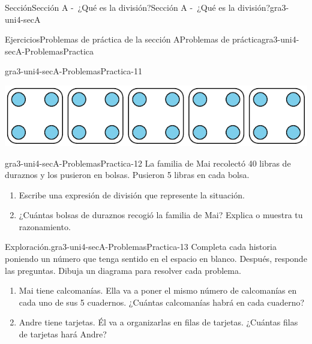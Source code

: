 \documentclass[twoside,10pt,]{article}
\begin{document}
\begin{sectionptx}{Sección}{Sección A -~¿Qué es la división?}{}{Sección A -~¿Qué es la división?}{}{}{gra3-uni4-secA}
\begin{exercises-subsection}{Ejercicios}{Problemas de práctica de la sección A}{}{Problemas de práctica}{}{}{gra3-uni4-secA-ProblemasPractica}
\begin{divisionexercise}{9}{}{}{gra3-uni4-secA-ProblemasPractica-11}
\begin{enumerate}[label=(\alph*)]
\begin{sidebyside}{2}{0}{0}{0}
\begin{sbspanel}{0.95}%
\includegraphics[width=\linewidth]{external/svg-source/tikz-file-151672.pdf}
\end{sbspanel}%
\end{sidebyside}%
\end{enumerate}
%
\end{divisionexercise}%
\begin{divisionexercise}{10}{}{}{gra3-uni4-secA-ProblemasPractica-12}%
La familia de Mai recolectó 40 libras de duraznos y los pusieron en bolsas. Pusieron 5 libras en cada bolsa.%
\par
%
\begin{enumerate}[label=(\alph*)]
\item{}Escribe una expresión de división que represente la situación.%
\item{}¿Cuántas bolsas de duraznos recogió la familia de Mai? Explica o muestra tu razonamiento.%
\end{enumerate}
%
\end{divisionexercise}%
\begin{divisionexercise}{11}{Exploración.}{}{gra3-uni4-secA-ProblemasPractica-13}%
Completa cada historia poniendo un número que tenga sentido en el espacio en blanco. Después, responde las preguntas. Dibuja un diagrama para resolver cada problema.%
\par
%
\begin{enumerate}[label=(\alph*)]
\item{}Mai tiene \textunderscore{}\textunderscore{}\textunderscore{}\textunderscore{}\textunderscore{}\textunderscore{}\textunderscore{}\textunderscore{}\textunderscore{}\textunderscore{} calcomanías. Ella va a poner el mismo número de calcomanías en cada uno de sus 5 cuadernos. ¿Cuántas calcomanías habrá en cada cuaderno?%
\item{}Andre tiene \textunderscore{}\textunderscore{}\textunderscore{}\textunderscore{}\textunderscore{}\textunderscore{}\textunderscore{}\textunderscore{}\textunderscore{}\textunderscore{} tarjetas. Él va a organizarlas en filas de \textunderscore{}\textunderscore{}\textunderscore{}\textunderscore{}\textunderscore{}\textunderscore{}\textunderscore{}\textunderscore{}\textunderscore{}\textunderscore{} tarjetas. ¿Cuántas filas de tarjetas hará Andre?%

\end{enumerate}
\end{divisionexercise}
\end{exercises-subsection}
\end{sectionptx}
\end{document}

